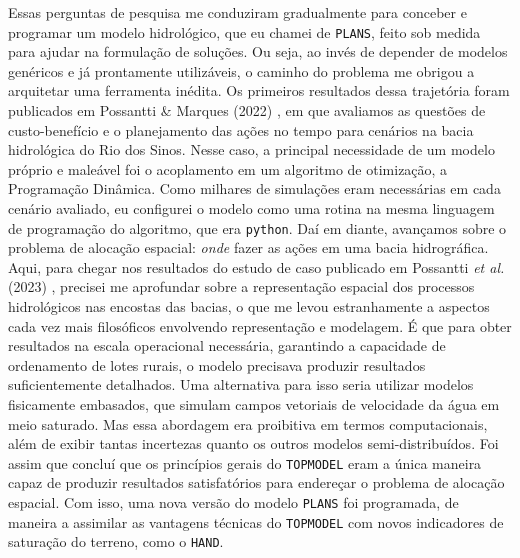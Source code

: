 \documentclass[./main.tex]{subfiles}
\begin{document}
\par Essas perguntas de pesquisa me conduziram gradualmente para conceber e programar um modelo hidrológico, que eu chamei de \texttt{PLANS}, feito sob medida para ajudar na formulação de soluções. Ou seja, ao invés de depender de modelos genéricos e já prontamente utilizáveis, o caminho do problema me obrigou a arquitetar uma ferramenta inédita. Os primeiros resultados dessa trajetória foram publicados em Possantti \& Marques (2022) \cite{Possantti2022a}, em que avaliamos as questões de custo-benefício e o planejamento das ações no tempo para cenários na bacia hidrológica do Rio dos Sinos. Nesse caso, a principal necessidade de um modelo próprio e maleável foi o acoplamento em um algoritmo de otimização, a Programação Dinâmica. Como milhares de simulações eram necessárias em cada cenário avaliado, eu configurei o modelo como uma rotina na mesma linguagem de programação do algoritmo, que era \texttt{python}. Daí em diante, avançamos sobre o problema de alocação espacial: \textit{onde} fazer as ações em uma bacia hidrográfica. Aqui, para chegar nos resultados do estudo de caso publicado em Possantti \textit{et al.} (2023) \cite{Possantti2023a}, precisei me aprofundar sobre a representação espacial dos processos hidrológicos nas encostas das bacias, o que me levou estranhamente a aspectos cada vez mais filosóficos envolvendo representação e modelagem. É que para obter resultados na escala operacional necessária, garantindo a capacidade de ordenamento de lotes rurais, o modelo precisava produzir resultados suficientemente detalhados. Uma alternativa para isso seria utilizar modelos fisicamente embasados, que simulam campos vetoriais de velocidade da água em meio saturado. Mas essa abordagem era proibitiva em termos computacionais, além de exibir tantas incertezas quanto os outros modelos semi-distribuídos. Foi assim que concluí que os princípios gerais do \texttt{TOPMODEL} eram a única maneira capaz de produzir resultados satisfatórios para endereçar o problema de alocação espacial. Com isso, uma nova versão do modelo \texttt{PLANS} foi programada, de maneira a assimilar as vantagens técnicas do \texttt{TOPMODEL} com novos indicadores de saturação do terreno, como o \texttt{HAND}.
\end{document}
